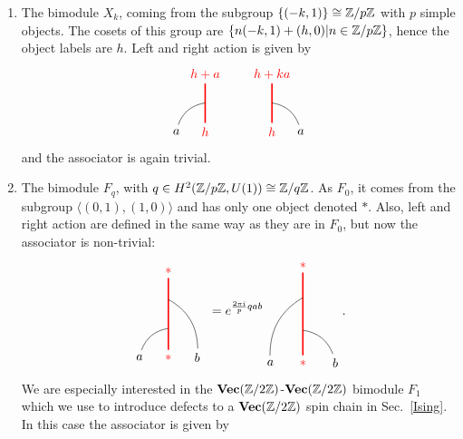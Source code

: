 	\begin{enumerate}
		\item The bimodule $X_k$, coming from the subgroup $\{(-k,1)\}\cong\mathbb{Z}/p\mathbb{Z}$ with $p$ simple objects. The cosets of this group are $\{n(-k,1)+(h,0)|n\in\mathbb{Z}/p\mathbb{Z}\}$, hence the object labels are $h$. Left and right action is given by 
			\begin{equation}
				\begin{tikzpicture}[scale=0.8,baseline=(current bounding box.center)]
				\node[red](m) at (0,0) {$h$};
				\node(b) at (-1,0) {$a$};
				\node[red](abm) at (0,2) {$h+a$};
				\draw[red,line width=0.4mm] (m)-- (abm);
				\draw (b) to [bend left] (0,1);
				\end{tikzpicture}\hspace{20pt}
				\begin{tikzpicture}[scale=0.8,baseline=(current bounding box.center)]
				\node[red](m) at (0,0) {$h$};
				\node(b) at (1,0) {$a$};
				\node[red](abm) at (0,2) {$h+ka$};
				\draw[red,line width=0.4mm] (m)-- (abm);
				\draw (b) to [bend right] (0,1);
				\end{tikzpicture}
			\end{equation}
		\noindent
		and the associator is again trivial.
		\item The bimodule $F_q$, with $q\in H^2(\mathbb{Z}/p\mathbb{Z},U(1))\cong\mathbb{Z}/q\mathbb{Z}$. As $F_0$, it comes from the subgroup $\langle(0,1),(1,0)\rangle$ and has only one object denoted $*$. Also, left and right action are defined in the same way as they are in $F_0$, but now the associator is non-trivial:
			\begin{equation}
				\begin{tikzpicture}[scale=0.8,baseline=(current bounding box.center)]
				\node[red](m) at (0,0) {$*$};
				\node(a) at (-1,0) {$a$};
				\node(b) at (1,0) {$b$};
				\node[red](abm) at (0,3) {$*$};
				\draw[red,line width=0.4mm] (m) -- (abm);
				\draw (a) to [bend left] (0,1);
				\draw (b) to [bend right] (0,2);
				\end{tikzpicture}\ =e^{\frac{2\pi i}{p}qab}
				\begin{tikzpicture}[scale=0.9,baseline=(current bounding box.center)]
				\node[red](m) at (0,0) {$*$};
				\node(a) at (-1,0) {$a$};
				\node(b) at (1,0) {$b$};
				\node[red](abm) at (0,3) {$*$};
				\draw[red,line width=0.4mm] (m) -- (abm);
				\draw (b) to [bend right] (0,1);
				\draw (a) to [bend left] (0,2);
				\end{tikzpicture}.
			\end{equation}
		We are especially interested in the $\textbf{Vec}(\mathbb{Z}/2\mathbb{Z})$-$\textbf{Vec}(\mathbb{Z}/2\mathbb{Z})$ bimodule $F_1$ which we use to introduce defects to a $\textbf{Vec}(\mathbb{Z}/2\mathbb{Z})$ spin chain in Sec.~\ref{Ising}. In this case the associator is given by

\end{enumerate}

